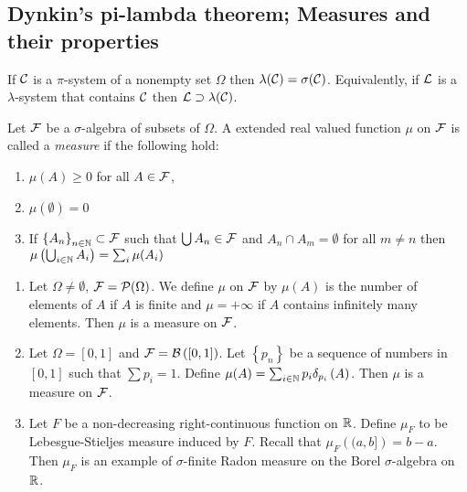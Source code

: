 \subsection{Dynkin's pi-lambda theorem; Measures and their properties}

\begin{theorem}
    If ${\cal C}$ is a $\pi$-system of a nonempty set $\Omega$ then $\lambda ({\cal C}) = \sigma ({\cal C})$. Equivalently, if ${\cal L}$ is a $\lambda$-system that contains ${\cal C}$ then ${\cal L} \supset \lambda ({\cal C})$.
    \label{thm:dynkin}
\end{theorem}

\begin{definition}
    Let ${\cal F}$ be a $\sigma$-algebra of subsets of $\Omega$. A extended real valued function $\mu$ on ${\cal F}$ is called a \textit{measure} if the following hold:
    \begin{enumerate}
	\item $\mu (A) \ge 0$ for all $A\in {\cal F}$,
	\item $\mu \left( \emptyset \right) = 0$
	\item If $\left\{ A_n \right\} _{n\in\mathbb N} \subset{\cal F}$ such that $\bigcup A_n \in {\cal F}$ and $A_n \cap A_m =\emptyset$ for all $m\ne n$ then $\mu \left( \bigcup_{i\in\mathbb N} A_i \right) =\sum_{i} \mu (A_i)$
    \end{enumerate}
    \label{def:measure}
\end{definition}

\begin{example}
    \begin{enumerate}
	\item Let $\Omega \ne \emptyset$, ${\cal F} = {\cal P} (\Omega)$. We define $\mu$ on ${\cal F}$ by $\mu (A)$ is the number of elements of $A$ if $A$ is finite and $\mu = +\infty$ if $A$ contains infinitely many elements. Then $\mu$ is a measure on ${\cal F}$.
	\item Let $\Omega =[0,1]$ and ${\cal F} = {\cal B} \left( [0,1] \right)$. Let $\left\{ p_n \right\}$ be a sequence of numbers in $[0,1]$ such that $\sum p_i =1$. Define $\mu (A) = \sum_{i\in\mathbb N} p_i \delta _{p_i} \left( A \right)$. Then $\mu $ is a measure on ${\cal F}$.
	\item Let $F$ be a non-decreasing right-continuous function on $\mathbb R$. Define $\mu _ F$ to be Lebesgue-Stieljes measure induced by $F$. Recall that $\mu _F \left( (a,b] \right) = b-a$. Then $\mu _F$ is an example of $\sigma$-finite Radon measure on the Borel $\sigma$-algebra on $\mathbb R$.
\end{enumerate}
\end{example}

